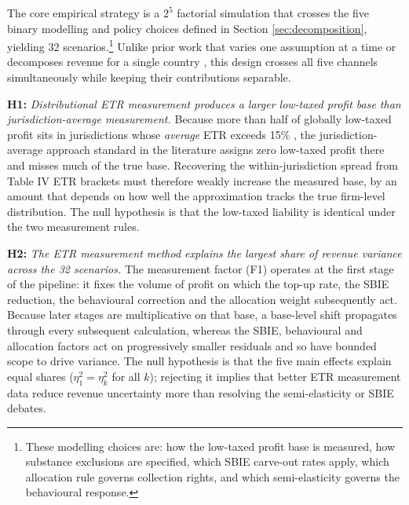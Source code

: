 \documentclass[11pt,a4paper]{article}
\newcommand{\hypothesis}[2]{\medskip\noindent\textbf{H#1:} \textit{#2}\smallskip}
\begin{document}
The core empirical strategy is a $2^5$ factorial simulation that crosses the five binary modelling and policy choices defined in Section \ref{sec:decomposition}, yielding 32 scenarios.\footnote{These modelling choices are: how the low-taxed profit base is measured, how substance exclusions are specified, which SBIE carve-out rates apply, which allocation rule governs collection rights, and which semi-elasticity governs the behavioural response.} Unlike prior work that varies one assumption at a time \citep{barake2022,hugger2026} or decomposes revenue for a single country \citep{boukal2026}, this design crosses all five channels simultaneously while keeping their contributions separable.

\hypothesis{1}{Distributional ETR measurement produces a larger low-taxed profit base than jurisdiction-average measurement.}
Because more than half of globally low-taxed profit sits in jurisdictions whose \emph{average} ETR exceeds 15\% \citep{hugger2026}, the jurisdiction-average approach standard in the literature \citep{barake2022} assigns zero low-taxed profit there and misses much of the true base. Recovering the within-jurisdiction spread from Table IV ETR brackets must therefore weakly increase the measured base, by an amount that depends on how well the approximation tracks the true firm-level distribution. The null hypothesis is that the low-taxed liability is identical under the two measurement rules.

\hypothesis{2}{The ETR measurement method explains the largest share of revenue variance across the 32 scenarios.}
The measurement factor (F1) operates at the first stage of the pipeline: it fixes the volume of profit on which the top-up rate, the SBIE reduction, the behavioural correction and the allocation weight subsequently act. Because later stages are multiplicative on that base, a base-level shift propagates through every subsequent calculation, whereas the SBIE, behavioural and allocation factors act on progressively smaller residuals and so have bounded scope to drive variance. The null hypothesis is that the five main effects explain equal shares ($\eta_1^2 = \eta_k^2$ for all $k$); rejecting it implies that better ETR measurement data reduce revenue uncertainty more than resolving the semi-elasticity or SBIE debates.
\end{document}
